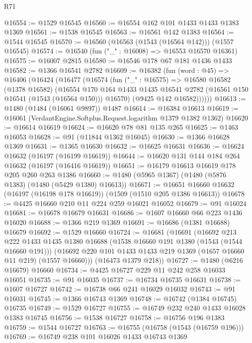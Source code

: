 \begin{lexlean}{R71}
\begin{coremodule}
@16554 := @1529 @16545
@16560 := @16554 @162 @101 @1433 @1433 @1383 @1369
@16561 := @1538 @16545
@16563 := @16561 @142 @1383
@16564 := @1544 @16545
@16570 := @16560 (@16563 (@1543 (@16564 @142))) (@1557 @16545)
@16574 := @16540 (fun ("_" : @16008) => @16553 @16570 @16361)
@16575 := @16007 @2815
@16580 := @16546 @178 @67 @181 @1436 @1433
@16582 := @1366 @16541 @2782
@16609 := @16382
    (fun (word : @45) =>
    @16406
      (@16424
        (@16477
          (@16574
            (fun ("_" : @16575) =>
            @16580
              @16582
              (@1378 @16582)
              (@16554
                @170
                @164
                @1433
                @1435
                @16541
                @2782
                (@16561 @150 @16541 (@1543 (@16564 @150)))
                @16570)
              (@9425 @142 @16582))))))
@16613 := @1480 (@1484 (@16061 @9897)) @1487
@16614 := @16384 @16613
@16619 := @16061 (VerdantEngine.Softplus.Request.logarithm @1379 @1382 @1362)
@16620 := @16614 @16619
@16624 := @16620 @78 @81 @135 @265
@16625 := @1463 @16053
@16628 := @91 (@11844 @1362 @16045)
@16630 := @1366 @16628 @1369
@16631 := @1365 @16630
@16632 := @16625 @16631
@16636 := @16624 @16632 (@16197 (@16199 @16619))
@16644 := @16620 @131 @144 @184 @264 @16632 (@16197 (@16416 @16619))
@16651 := @16179 @16613 @16619 @178 @205 @260 @263 @1386
@16660 := @1480 (@5965 @1367) (@1480 (@5876 @1383) (@1480 (@5429 @1380) @16613))
@16671 := @16651 @16660 @16632 (@16197 (@16198 @178 @16619)) (@1509 (@1510 @205 @1386 @16613))
@16678 := @4425 @16660 @210 @11 @224 @259 @16021 @16052
@16679 := @91 @16024
@16681 := @16678 @16679 @16631
@16686 := @1607 @16660 @66 @223 @1436 @16020
@16688 := @1366 @219 @1369
@16691 := @16686 (@1381 @16688) @16679
@16692 := @1529 @16660
@16724 := @16681
    (@16691
      (@16692
        @213
        @222
        @1433
        @1435
        @1380
        @16688
        (@1538 @16660 @191 @1380 (@1543 (@1544 @16660 @191)))
        (@16692 @220 @101 @1433 @1433 @219 @1369 (@1657 @16660 @11 @219) (@1557 @16660)))
      (@16473 @1379 @218))
@16727 := @1480 (@6216 @16679) @16660
@16734 := @4425 @16727 @229 @11 @242 @258 @16033 @16051
@16735 := @91 @16035
@16737 := @16734 @16735 @16631
@16738 := @1607 @16727
@16742 := @16738 @66 @241 @16029 @16032
@16743 := @91 @16031
@16745 := @1366 @16743 @1369
@16748 := @16742 (@1384 @16745) @16735
@16749 := @1529 @16727
@16755 := @16749 @232 @240 @1433 @16028 @1383 @16745
@16756 := @1538 @16727
@16758 := @16756 @196 @1383
@16759 := @1544 @16727
@16763 := @16755 (@16758 (@1543 (@16759 @196)))
@16769 := @16749 @238 @101 @16026 @1433 @16743 @1369

\end{coremodule}
\end{lexlean}
